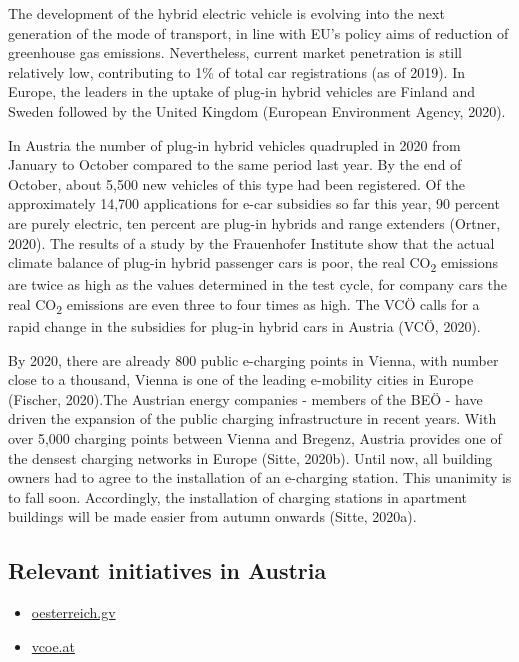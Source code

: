 \documentclass[
]{book}
\providecommand{\tightlist}{%
  \setlength{\itemsep}{0pt}\setlength{\parskip}{0pt}}
\begin{document}
The development of the hybrid electric vehicle is evolving into the next generation of the mode of transport, in line with EU's policy aims of reduction of greenhouse gas emissions. Nevertheless, current market penetration is still relatively low, contributing to 1\% of total car registrations (as of 2019). In Europe, the leaders in the uptake of plug-in hybrid vehicles are Finland and Sweden followed by the United Kingdom (European Environment Agency, 2020).

In Austria the number of plug-in hybrid vehicles quadrupled in 2020 from January to October compared to the same period last year. By the end of October, about 5,500 new vehicles of this type had been registered. Of the approximately 14,700 applications for e-car subsidies so far this year, 90 percent are purely electric, ten percent are plug-in hybrids and range extenders (Ortner, 2020).
The results of a study by the Frauenhofer Institute show that the actual climate balance of plug-in hybrid passenger cars is poor, the real CO\textsubscript{2} emissions are twice as high as the values determined in the test cycle, for company cars the real CO\textsubscript{2} emissions are even three to four times as high. The VCÖ calls for a rapid change in the subsidies for plug-in hybrid cars in Austria (VCÖ, 2020).

By 2020, there are already 800 public e-charging points in Vienna, with number close to a thousand, Vienna is one of the leading e-mobility cities in Europe (Fischer, 2020).The Austrian energy companies - members of the BEÖ - have driven the expansion of the public charging infrastructure in recent years. With over 5,000 charging points between Vienna and Bregenz, Austria provides one of the densest charging networks in Europe (Sitte, 2020b).
Until now, all building owners had to agree to the installation of an e-charging station. This unanimity is to fall soon. Accordingly, the installation of charging stations in apartment buildings will be made easier from autumn onwards (Sitte, 2020a).

\hypertarget{relevant-initiatives-in-austria-14}{%
\subsection*{Relevant initiatives in Austria}\label{relevant-initiatives-in-austria-14}}

\begin{itemize}
\tightlist
\item
  \href{https://www.oesterreich.gv.at/themen/bauen_wohnen_und_umwelt/elektroautos_und_e_mobilitaet/Seite.4320010.html}{oesterreich.gv}
\item
  \href{https://www.vcoe.at/presse/presseaussendungen/detail/vcoe-neue-studie-zeigt-schlechte-klimabilanz-von-plug-in-hybrid-pkw}{vcoe.at}
\end{itemize}
\end{document}
